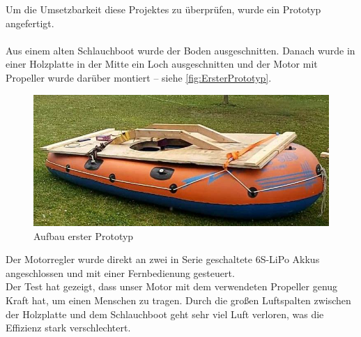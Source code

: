 Um die Umsetzbarkeit diese Projektes zu überprüfen, wurde ein Prototyp angefertigt.\\
\\
Aus einem alten Schlauchboot wurde der Boden ausgeschnitten. Danach wurde in einer Holzplatte in der Mitte ein Loch ausgeschnitten und der Motor mit Propeller wurde darüber montiert -- siehe \autoref{fig:ErsterPrototyp}.
\begin{figure}[h!]
  \centering
  \includegraphics[width=.95\textwidth]{./Aufbau1.jpg}
  \caption{Aufbau erster Prototyp}
  \label{fig:ErsterPrototyp}
\end{figure}

Der Motorregler wurde direkt an zwei in Serie geschaltete 6S-LiPo Akkus angeschlossen und mit einer Fernbedienung gesteuert.\\
Der Test hat gezeigt, dass unser Motor mit dem verwendeten Propeller genug Kraft hat, um einen Menschen zu tragen. Durch die großen Luftspalten zwischen der Holzplatte und dem Schlauchboot geht sehr viel Luft verloren, was die Effizienz stark verschlechtert.

